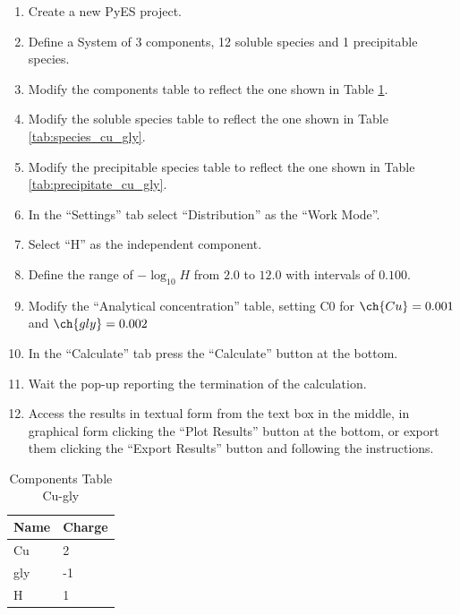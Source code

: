\documentclass[a4paper, 12pt]{article}
\begin{document}
\begin{enumerate}
    \item Create a new PyES project.
    \item Define a System of 3 components, 12 soluble species and 1 precipitable species.
    \item Modify the components table to reflect the one shown in Table \ref*{tab:comp_cu_gly}.
    \item Modify the soluble species table to reflect the one shown in Table \ref*{tab:species_cu_gly}.
    \item Modify the precipitable species table to reflect the one shown in Table \ref*{tab:precipitate_cu_gly}.
    \item In the ``Settings'' tab select ``Distribution'' as the ``Work Mode''.
    \item Select ``H'' as the independent component.
    \item Define the range of $-\log_{10}H$ from $2.0$ to $12.0$ with intervals of $0.100$.
    \item Modify the ``Analytical concentration'' table, setting C0 for $\ch{Cu} = 0.001$ and  $\ch{gly} = 0.002$
    \item In the ``Calculate'' tab press the ``Calculate'' button at the bottom.
    \item Wait the pop-up reporting the termination of the calculation.
    \item Access the results in textual form from the text box in the middle, in graphical form clicking the ``Plot Results'' button at the bottom, or export them clicking the ``Export Results'' button and following the instructions.
\end{enumerate}

\begin{table}[h!]
\centering
\begin{tabular}{|l|l|}
    \hline
    \textbf{Name} & \textbf{Charge} \\ \hline
    Cu   & 2      \\ \hline
    gly  & -1     \\ \hline
    H    & 1      \\ \hline
\end{tabular}
\caption{Components Table Cu-gly}
\label{tab:comp_cu_gly}
\end{table}
\end{document}
